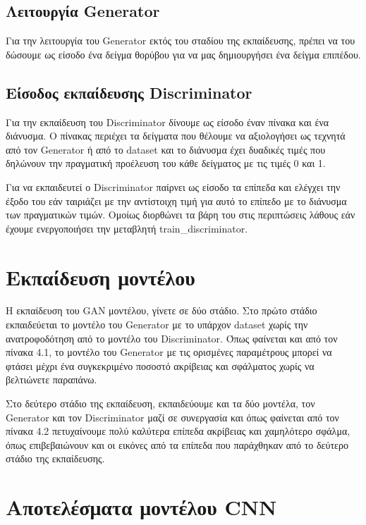 \subsection{Λειτουργία Generator}
Για την λειτουργία του Generator εκτός του σταδίου της εκπαίδευσης, πρέπει να του δώσουμε ως είσοδο ένα δείγμα θορύβου για να μας δημιουργήσει ένα δείγμα επιπέδου.

\subsection{Είσοδος εκπαίδευσης Discriminator}
Για την εκπαίδευση του Discriminator δίνουμε ως είσοδο έναν πίνακα και ένα διάνυσμα. Ο πίνακας περιέχει τα δείγματα που θέλουμε να αξιολογήσει ως τεχνητά από τον Generator ή από το dataset και το διάνυσμα έχει δυαδικές τιμές που δηλώνουν την πραγματική προέλευση του κάθε δείγματος με τις τιμές 0 και 1.
\par
Για να εκπαιδευτεί ο Discriminator παίρνει ως είσοδο τα επίπεδα και ελέγχει την έξοδο του εάν ταιριάζει με την αντίστοιχη τιμή για αυτό το επίπεδο με το διάνυσμα των πραγματικών τιμών. Ομοίως διορθώνει τα βάρη του στις περιπτώσεις λάθους εάν έχουμε ενεργοποιήσει την μεταβλητή train\_discriminator.

\section{Εκπαίδευση μοντέλου}
\par
Η εκπαίδευση του GAN μοντέλου, γίνετε σε δύο στάδιο. Στο πρώτο στάδιο εκπαιδεύεται το μοντέλο του Generator με το υπάρχον dataset χωρίς την ανατροφοδότηση από το μοντέλο του Discriminator. Όπως φαίνεται και από τον πίνακα 4.1, το μοντέλο του Generator με τις ορισμένες παραμέτρους μπορεί να φτάσει μέχρι ένα συγκεκριμένο ποσοστό ακρίβειας και σφάλματος χωρίς να βελτιώνετε παραπάνω.
\par
Στο δεύτερο στάδιο της εκπαίδευση, εκπαιδεύουμε και τα δύο μοντέλα, τον Generator και τον Discriminator μαζί σε συνεργασία και όπως φαίνεται από τον πίνακα 4.2 πετυχαίνουμε πολύ καλύτερα επίπεδα ακρίβειας και χαμηλότερο σφάλμα, όπως επιβεβαιώνουν και οι εικόνες από τα επίπεδα που παράχθηκαν από το δεύτερο στάδιο της εκπαίδευσης.


\section{Αποτελέσματα μοντέλου CNN}

